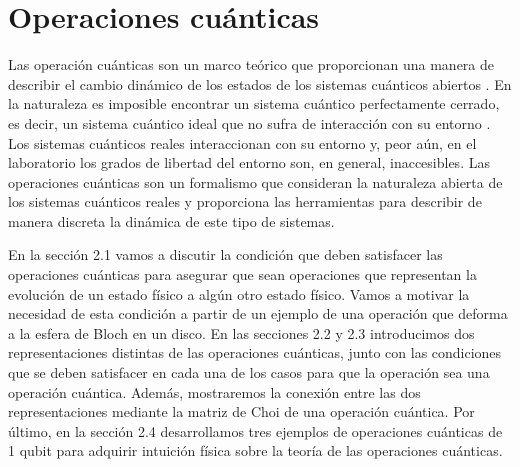 \chapter{Operaciones cuánticas} \label{ch2}

Las operación cuánticas son un marco teórico que proporcionan
una manera de describir el cambio dinámico de los estados 
de los sistemas cuánticos abiertos \cite{bengtsson_zyczkowski_2017}. 
En la naturaleza es imposible
encontrar un sistema cuántico perfectamente cerrado, es decir, un 
sistema cuántico ideal que no sufra de interacción con su entorno
\cite{nielsen_chuang_2011}. Los sistemas cuánticos reales 
interaccionan con su entorno y, peor aún, en el laboratorio 
los grados de libertad del entorno son, en general, inaccesibles.
Las operaciones cuánticas son un formalismo que consideran
la naturaleza abierta de los sistemas cuánticos reales y proporciona
las herramientas para describir de manera discreta la dinámica
de este tipo de sistemas.

En la sección 2.1 vamos a discutir la condición
que deben satisfacer las operaciones cuánticas para asegurar
que sean operaciones que representan la evolución de un estado físico 
a algún otro estado físico.
Vamos a motivar la necesidad de esta condición
a partir de un ejemplo de una operación que deforma a la esfera de
Bloch en un disco. En las secciones 2.2 y 2.3 introducimos dos 
representaciones distintas de las operaciones cuánticas, junto 
con las condiciones que se deben satisfacer en cada una de los
casos para que la operación sea una operación cuántica. 
Además, mostraremos la conexión entre 
las dos representaciones mediante la matriz de Choi de 
una operación cuántica. Por último, en la sección 2.4 
desarrollamos tres ejemplos de operaciones cuánticas de 1 qubit 
para adquirir intuición física sobre la teoría de las operaciones cuánticas.
